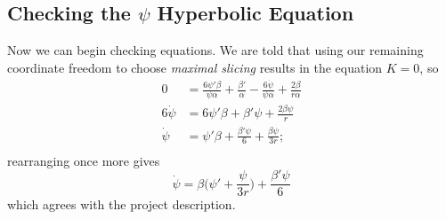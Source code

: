 \documentclass[12pt]{article}
\numberwithin{equation}{section}
\begin{document}
\subsection{Checking the $\psi$ Hyperbolic Equation}
Now we can begin checking equations.  We are told that using our remaining coordinate freedom to choose \textit{maximal slicing} results in the equation $K = 0$, so
\begin{equation}
\begin{aligned}
0 &= \frac{6 \psi' \beta}{\psi \alpha} + \frac{\beta'}{\alpha} - \frac{6 \dot{\psi}}{\psi \alpha} + \frac{2 \beta}{r \alpha} \\
6 \dot{\psi} &= 6 \psi' \beta + \beta' \psi + \frac{2 \beta \psi}{r} \\
\dot{\psi} &= \psi' \beta + \frac{\beta' \psi}{6} + \frac{\beta \psi}{3 r}; \\
\end{aligned}
\end{equation}
rearranging once more gives
\begin{equation}
\boxed{\dot{\psi} = \beta \Big(\psi' + \frac{\psi}{3 r} \Big) + \frac{\beta' \psi}{6} }
\end{equation}
which agrees with the project description.
\end{document}
